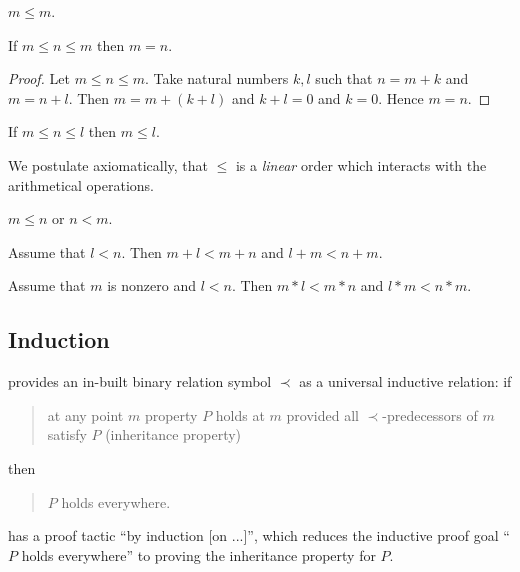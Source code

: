 \documentclass[11pt]{article}
\begin{document}
\begin{forthel}

\begin{lemma}
$m \leq m$.
\end{lemma}

\begin{lemma}
If $m \leq n \leq m$ then $m = n$.
\end{lemma}
\begin{proof}
Let $m \leq n \leq m$.
Take natural numbers $k,l$ such that
$n = m + k$ and $m = n + l$.
Then $m = m + (k + l)$ and $k + l = 0$ and $k = 0$.
Hence $m = n$.
\end{proof}

\begin{lemma}
If $m \leq n \leq l$ then  $m \leq l$.
\end{lemma}
\end{forthel}
We postulate axiomatically, that $\leq$ is a \textit{linear} order which interacts
with the arithmetical operations.
\begin{forthel}
\begin{axiom}
$m \leq n$ or $n < m$.
\end{axiom}

\begin{lemma}
Assume that $l < n$.
Then $m + l < m + n$ and $l + m < n + m$.
\end{lemma}

\begin{lemma}
Assume that $m$ is nonzero and $l < n$.
Then $m * l < m * n$ and $l * m < n * m$.
\end{lemma}
\end{forthel}


\subsection{Induction}

\Naproche provides an in-built binary relation
symbol $\prec$ as a universal inductive relation: if 

\begin{quote}
at any
point $m$ property $P$ holds at $m$ provided all
$\prec$-predecessors of $m$ satisfy $P$ (inheritance property)
\end{quote} 
then 
\begin{quote}
$P$ holds everywhere.
\end{quote}

\Naproche has a proof tactic ``by induction [on ...]'', which 
reduces the inductive proof goal ``$P$ holds everywhere'' 
to proving the inheritance property for $P$.
\end{document}
